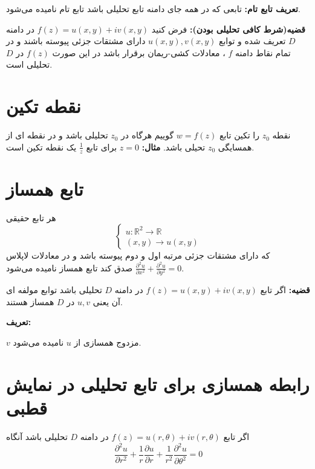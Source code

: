 \documentclass[12pt]{report}
\begin{document}
 	 	 	  \textbf{تعریف تابع تام:}
 	 	 	  تابعی که در همه جای دامنه تابع تحلیلی باشد تابع تام نامیده می‌شود.
 	 	 	  
 	 	 	  \textbf{قضیه(شرط کافی تحلیلی بودن):}
 	 	 	  فرض کنید
 	 	 	  $f(z) = u(x, y) + iv(x, y)$
 	 	 	  در دامنه 
 	 	 	  $D$
 	 	 	  تعریف شده و توابع 
 	 	 	  $ u(x, y) , 	v(x, y)$
 	 	 	  دارای مشتقات جزئی پیوسته باشند و در تمام نقاط دامنه 
 	 	 	  $f$
 	 	 	  ،
 	 	 	  معادلات کشی-ریمان برقرار باشد در این صورت 
 	 	 	  $f(z)$
 	 	 	  در $D$
 	 	 	  تحلیلی است.
 	 	 	  
 	 	 	  \section{نقطه تکین}
 	 	 	  نقطه 
 	 	 	  $z_0$
 	 	 	  را تکین تابع 
 	 	 	  $w = f(z)$
 	 	 	  گوییم هرگاه در 
 	 	 	  $z_0$
 	 	 	  تحلیلی باشد و در نقطه ای از همسایگی
 	 	 	  $z_0$
 	 	 	  تحیلی باشد.
 	 	 	  \textbf{مثال:}
 	 	 	  $z= 0 $
 	 	 	  برای تابع
 	 	 	  $\frac{1}{z}$
 	 	 	  یک نقطه تکین است.	 	 
 	 	 	  
 	 	 	  \section{تابع همساز}
 	 	 	   هر تابع حقیقی
 	 	 	   \[
 	 	 	   \begin{cases}
 	 	 	   	u : \mathbb{R}^2 \rightarrow \mathbb{R}\\
 	 	 	   	(x, y) \rightarrow u(x, y)
 	 	 	   \end{cases}
 	 	 	   \]
 	 	 	   که دارای مشتقات جزئی مرتبه اول و دوم پیوسته باشد و در معادلات لاپلاس
 	 	 	   $\frac{\partial^2u}{\partial x^2}+ \frac{\partial^2u}{\partial y^2} = 0$
 	 	 	   صدق کند تابع همساز نامیده می‌شود.
 	 	 	   
 	 	 	   \textbf{قضیه:}
 	 	 	   اگر تابع 
 	 	 	   $f(z) = u(x, y) + iv(x, y)$
 	 	 	   در دامنه 
 	 	 	  $D$
 	 	 	  تحلیلی باشد توابع  مولفه ای آن یعنی 
 	 	 	  $u, v$
 	 	 	  در 
 	 	 	  $D$
 	 	 	  همساز هستند.
 	 	 	  
 	 	 	  \textbf{تعریف:}
 	 	 	  
 	 	 	  $v$
 	 	 	  مزدوج همسازی از 
 	 	 	  $u$
 	 	 	  نامیده می‌شود.
 	 	 	  
 	 	 	  
 	 	 	  \section{رابطه همسازی برای تابع تحلیلی در نمایش قطبی}
 	 	 	  اگر تابع
 	 	 	  $f(z) = u(r, \theta) + iv(r, \theta)$
 	 	 	  در دامنه 
 	 	 	  $D$
 	 	 	  تحلیلی باشد آنگاه
 	 	 	  $$ \frac{\partial^2 u}{\partial r^2} + \frac{1}{r}\frac{\partial u}{\partial r}+\frac{1}{r^2}\frac{\partial^2 u}{\partial \theta^2} = 0$$
 	 	 	  
\end{document}

